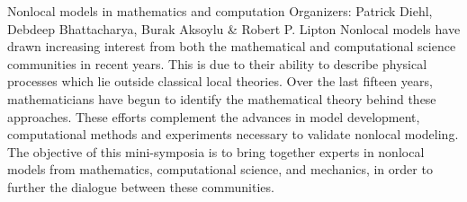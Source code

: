 \label{mini02}

\miniabs
{Nonlocal models in mathematics and computation}
{Organizers: Patrick Diehl, Debdeep Bhattacharya, Burak Aksoylu \& Robert P. Lipton}
{Nonlocal models have drawn increasing interest from both the mathematical and computational science communities in recent years. This is due to their ability to describe physical processes which lie outside classical local theories. Over the last fifteen years, mathematicians have begun to identify the mathematical theory behind these approaches. These efforts complement the advances in model development, computational methods and experiments necessary to validate nonlocal modeling. The objective of this mini-symposia is to bring together experts in nonlocal models from mathematics, computational science, and mechanics, in order to further the dialogue between these communities.}

